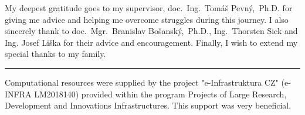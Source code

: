 \documentclass[11pt,twoside,a4paper]{book}
\begin{document}
	\translate

	{
		
		\newpage
	}

	\coverpagestarts

	\acknowledgements
	\noindent
	My deepest gratitude goes to my supervisor, doc.~Ing.~Tomáš Pevný,~Ph.D. for giving me advice and helping me overcome struggles during this journey. I also sincerely thank to doc.~Mgr.~Branislav Bošanský,~Ph.D., Ing.~Thorsten Sick and Ing. Josef Liška for their advice and encouragement. Finally, I wish to extend my special thanks to my family.

	\noindent\rule{\textwidth}{0.4pt}

	\noindent Computational resources were supplied by the project "e-Infrastruktura CZ" (e-INFRA LM2018140) provided within the program Projects of Large Research, Development and Innovations Infrastructures. This support was very beneficial.


\end{document}
